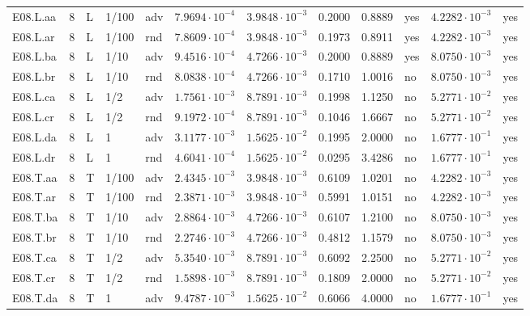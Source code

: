 {\begin{longtable}{@{}lllllllllll l@{}}
E08.L.aa & 8 & L & 1/100 & adv & $7.9694\cdot 10^{-4}$ & $3.9848\cdot 10^{-3}$ & 0.2000 & 0.8889 & yes & $4.2282\cdot 10^{-3}$ & yes \\
E08.L.ar & 8 & L & 1/100 & rnd & $7.8609\cdot 10^{-4}$ & $3.9848\cdot 10^{-3}$ & 0.1973 & 0.8911 & yes & $4.2282\cdot 10^{-3}$ & yes \\
E08.L.ba & 8 & L & 1/10 & adv & $9.4516\cdot 10^{-4}$ & $4.7266\cdot 10^{-3}$ & 0.2000 & 0.8889 & yes & $8.0750\cdot 10^{-3}$ & yes \\
E08.L.br & 8 & L & 1/10 & rnd & $8.0838\cdot 10^{-4}$ & $4.7266\cdot 10^{-3}$ & 0.1710 & 1.0016 & no & $8.0750\cdot 10^{-3}$ & yes \\
E08.L.ca & 8 & L & 1/2 & adv & $1.7561\cdot 10^{-3}$ & $8.7891\cdot 10^{-3}$ & 0.1998 & 1.1250 & no & $5.2771\cdot 10^{-2}$ & yes \\
E08.L.cr & 8 & L & 1/2 & rnd & $9.1972\cdot 10^{-4}$ & $8.7891\cdot 10^{-3}$ & 0.1046 & 1.6667 & no & $5.2771\cdot 10^{-2}$ & yes \\
E08.L.da & 8 & L & 1 & adv & $3.1177\cdot 10^{-3}$ & $1.5625\cdot 10^{-2}$ & 0.1995 & 2.0000 & no & $1.6777\cdot 10^{-1}$ & yes \\
E08.L.dr & 8 & L & 1 & rnd & $4.6041\cdot 10^{-4}$ & $1.5625\cdot 10^{-2}$ & 0.0295 & 3.4286 & no & $1.6777\cdot 10^{-1}$ & yes \\
E08.T.aa & 8 & T & 1/100 & adv & $2.4345\cdot 10^{-3}$ & $3.9848\cdot 10^{-3}$ & 0.6109 & 1.0201 & no & $4.2282\cdot 10^{-3}$ & yes \\
E08.T.ar & 8 & T & 1/100 & rnd & $2.3871\cdot 10^{-3}$ & $3.9848\cdot 10^{-3}$ & 0.5991 & 1.0151 & no & $4.2282\cdot 10^{-3}$ & yes \\
E08.T.ba & 8 & T & 1/10 & adv & $2.8864\cdot 10^{-3}$ & $4.7266\cdot 10^{-3}$ & 0.6107 & 1.2100 & no & $8.0750\cdot 10^{-3}$ & yes \\
E08.T.br & 8 & T & 1/10 & rnd & $2.2746\cdot 10^{-3}$ & $4.7266\cdot 10^{-3}$ & 0.4812 & 1.1579 & no & $8.0750\cdot 10^{-3}$ & yes \\
E08.T.ca & 8 & T & 1/2 & adv & $5.3540\cdot 10^{-3}$ & $8.7891\cdot 10^{-3}$ & 0.6092 & 2.2500 & no & $5.2771\cdot 10^{-2}$ & yes \\
E08.T.cr & 8 & T & 1/2 & rnd & $1.5898\cdot 10^{-3}$ & $8.7891\cdot 10^{-3}$ & 0.1809 & 2.0000 & no & $5.2771\cdot 10^{-2}$ & yes \\
E08.T.da & 8 & T & 1 & adv & $9.4787\cdot 10^{-3}$ & $1.5625\cdot 10^{-2}$ & 0.6066 & 4.0000 & no & $1.6777\cdot 10^{-1}$ & yes \\

\end{longtable}}
